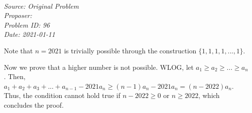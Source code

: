   
\SSbreak\\
\emph{Source: Original Problem}\\
\emph{Proposer: \Pchan}\\ %
\emph{Problem ID: 96}\\
\emph{Date: 2021-01-11}\\
\SSbreak

\bigskip

\begin{solution}\hfil\medskip
    
Note that $n=2021$ is trivially possible  through the construction $\{1,1,1,1, ... ,1\}$. 

Now we prove that a higher number is not possible. WLOG, let $a_1 \geq a_2 \geq ... \geq a_n$. Then, $a_1 + a_2 + a_3 + ... + a_{n-1} -2021a_n \geq (n-1)a_n -2021a_n = (n-2022)a_n$. Thus, the condition cannot hold true if $n-2022 \geq 0$ or $n \geq 2022$, which concludes the proof.

\end{solution}\bigskip
